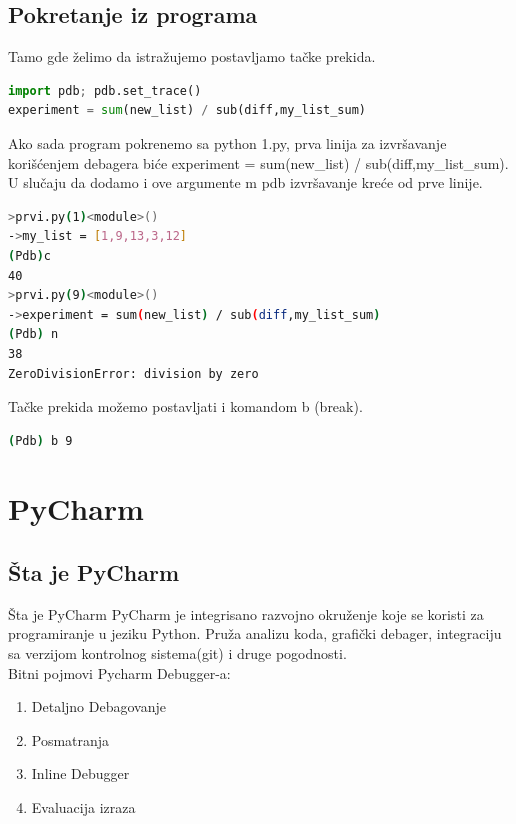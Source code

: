 \documentclass{beamer}
\begin{document}
\subsection{Pokretanje iz programa}
\begin{frame}[fragile]
Tamo gde želimo da istražujemo postavljamo tačke prekida.
\begin{lstlisting}[language = python]
import pdb; pdb.set_trace()
experiment = sum(new_list) / sub(diff,my_list_sum)
\end{lstlisting}
Ako sada program pokrenemo sa {\color{blue}python 1.py}, prva linija za izvršavanje korišćenjem debagera biće {\color{blue}experiment = sum(new\_list) / sub(diff,my\_list\_sum)}. U slučaju da dodamo i ove argumente {\color{blue}\textendash m  pdb} izvršavanje kreće od prve linije.
\begin{lstlisting}[language = bash]
>prvi.py(1)<module>()
->my_list = [1,9,13,3,12]
(Pdb)c
40
>prvi.py(9)<module>()
->experiment = sum(new_list) / sub(diff,my_list_sum)
(Pdb) n
38
ZeroDivisionError: division by zero
\end{lstlisting}
Tačke prekida možemo postavljati i komandom b (break).  
\begin{lstlisting}[language = bash]
(Pdb) b 9 
\end{lstlisting}

\end{frame}   


\section{PyCharm}
\subsection{Šta je PyCharm}
\begin{frame}{Šta je PyCharm}
PyCharm je integrisano razvojno okruženje koje se koristi za programiranje u jeziku Python. Pruža analizu koda, grafički debager, integraciju sa verzijom kontrolnog sistema(git) i druge pogodnosti.\\
Bitni pojmovi Pycharm Debugger-a:
\begin{enumerate}
    \item Detaljno Debagovanje
    \item Posmatranja
    \item Inline Debugger
    \item Evaluacija izraza
\end{enumerate}
\end{frame}
\end{document}
